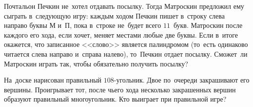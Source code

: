 \begin{problems}
\item
Почтальон Печкин не~хотел отдавать посылку.
Тогда Матроскин предложил ему сыграть в~следующую игру: каждым ходом Печкин
пишет в~строку слева направо буквы \textsf{М} и~\textsf{П}, пока в~строке
не~будет всего $11$~букв.
Матроскин после каждого его хода, если хочет, меняет местами любые две буквы.
Если в~итоге окажется, что записанное <<слово>> является палиндромом
(то~есть одинаково читается слева направо и~справа налево), то~Печкин отдает
посылку.
Сможет~ли Матроскин играть так, чтобы обязательно получить посылку?

\item
На~доске нарисован правильный $108$-угольник.
Двое по~очереди закрашивают его вершины.
Проигрывает тот, после чьего хода несколько закрашенных вершин образуют
правильный многоугольник.
Кто выиграет при правильной игре?

\end{problems}

